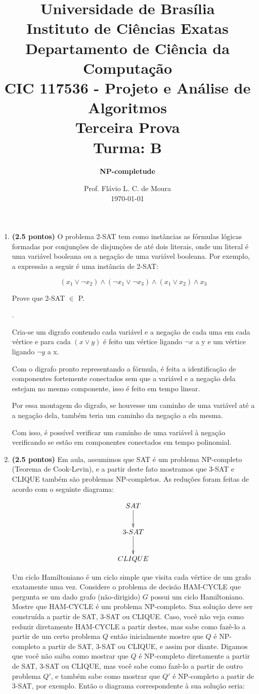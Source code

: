 \documentclass[12pt]{article}
\title{{\large Universidade de Brasília \\ Instituto de Ciências Exatas \\
Departamento de Ciência da Computação} \\[1cm]
CIC 117536 - Projeto e Análise de Algoritmos \\[.5cm]  Terceira Prova \\[.5cm] Turma: B}
\author{{\bf NP-completude}}
\date{Prof. Flávio L. C. de Moura \\[.5cm] \today}
\newcommand{\resposta}[1]{ \noindent {\bf Solução}.{\color{blue} #1}}
\begin{document}
\maketitle

\begin{enumerate}
\item {\bf (2.5 pontos)} O problema 2-SAT tem como instâncias as
  fórmulas lógicas formadas por conjunções de disjunções de até dois
  literais, onde um literal é uma variável booleana ou a negação de
  uma variável booleana. Por exemplo, a expressão a seguir é uma
  instância de 2-SAT:

  $$(x_1\lor \neg x_2)\land (\neg x_1 \lor \neg x_3) \land (x_1 \lor x_2) \land x_3$$

  Prove que 2-SAT $\in$ P.

 
  \resposta{
    Cria-se um digrafo contendo cada variável e a negação de cada uma em cada vértice e para cada ${(x\lor y)}$ é feito um vértice ligando ${\neg x}$ a y e um vértice ligando ${\neg y}$ a x.

	Com o digrafo pronto representando a fórmula, é feita a identificação de componentes fortemente conectados sem que a variável e a negação dela estejam no mesmo componente, isso é feito em tempo linear.

	Por essa montagem do digrafo, se houvesse um caminho de uma variável até a a negação dela, também teria um caminho da negação a ela mesma.

	Com isso, é possível verificar um caminho de uma variável à negação verificando se estão em componentes conectados em tempo polinomial.
  }
  
\item {\bf (2.5 pontos)} Em aula, assumimos que SAT é um problema
  NP-completo (Teorema de Cook-Levin), e a partir deste fato mostramos
  que 3-SAT e CLIQUE também são problemas NP-completos. As reduções
  foram feitas de acordo com o seguinte diagrama:

  $$\xymatrix{
    SAT \ar[d] \\
    3\mbox{-}SAT \ar[d] \\
    CLIQUE 
  }$$
  
  Um ciclo Hamiltoniano é um ciclo simple que visita cada vértice de
  um grafo exatamente uma vez. Considere o problema de decisão
  HAM-CYCLE que pergunta se um dado grafo (não-dirigido) $G$ possui um
  ciclo Hamiltoniano. Mostre que HAM-CYCLE é um problema
  NP-completo. Sua solução deve ser construída a partir de SAT, 3-SAT
  ou CLIQUE. Caso, você não veja como reduzir diretamente HAM-CYCLE a
  partir destes, mas sabe como fazê-lo a partir de um certo problema
  $Q$ então inicialmente mostre que $Q$ é NP-completo a partir de SAT,
  3-SAT ou CLIQUE, e assim por diante. Digamos que você não saiba como
  mostrar que $Q$ é NP-completo diretamente a partir de SAT, 3-SAT ou
  CLIQUE, mas você sabe como fazê-lo a partir de outro problema $Q'$,
  e também sabe como mostrar que $Q'$ é NP-completo a partir de 3-SAT,
  por exemplo. Então o diagrama correspondente à sua solução seria:


\end{enumerate}
\end{document}
